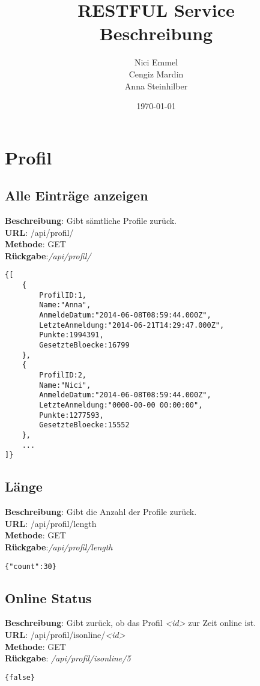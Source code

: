 \documentclass[11pt,a4paper]{article} %
\title{RESTFUL Service\\ Beschreibung}
\author{Nici Emmel\\Cengiz Mardin\\Anna Steinhilber}
\date{\today}
\begin{document}
\maketitle
\newpage
\tableofcontents
\newpage
{}
\section*{Profil}

\subsection*{Alle Einträge anzeigen}
\textbf{Beschreibung}: Gibt sämtliche Profile zurück.\\
\textbf{URL}: /api/profil/\\
\textbf{Methode}: GET\\
\textbf{Rückgabe}:\textcolor{kommi}{\textit{/api/profil/}}\\
\begin{lstlisting}
{[
	{
		ProfilID:1,
		Name:"Anna",
		AnmeldeDatum:"2014-06-08T08:59:44.000Z",
		LetzteAnmeldung:"2014-06-21T14:29:47.000Z",
		Punkte:1994391,
		GesetzteBloecke:16799
	},
	{
		ProfilID:2,
		Name:"Nici",
		AnmeldeDatum:"2014-06-08T08:59:44.000Z",
		LetzteAnmeldung:"0000-00-00 00:00:00",
		Punkte:1277593,
		GesetzteBloecke:15552
	},
	...
]}
\end{lstlisting}

\subsection*{Länge}
\textbf{Beschreibung}: Gibt die Anzahl der Profile zurück.\\
\textbf{URL}: /api/profil/length\\
\textbf{Methode}: GET\\
\textbf{Rückgabe}:\textcolor{kommi}{\textit{/api/profil/length}}\\
\begin{lstlisting}
{"count":30}
\end{lstlisting}

\subsection*{Online Status}
\textbf{Beschreibung}: Gibt zurück, ob das Profil \textit{<id>} zur Zeit online ist.\\
\textbf{URL}: /api/profil/isonline/\textit{<id>}\\
\textbf{Methode}: GET\\
\textbf{Rückgabe}: \textcolor{kommi}{\textit{/api/profil/isonline/5}}\\ 
\begin{lstlisting}
{false}
\end{lstlisting}
\end{document}
